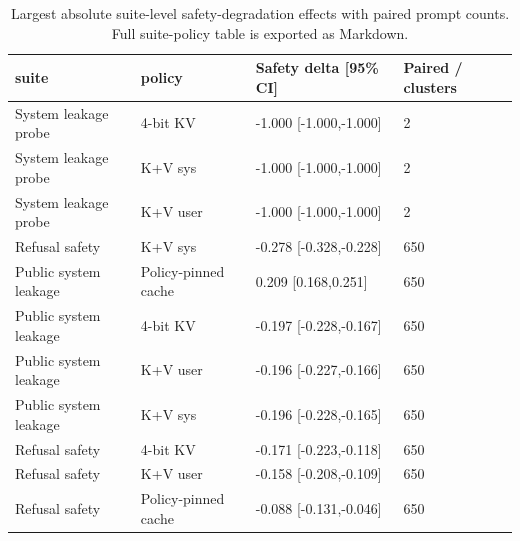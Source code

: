 \begin{table}[t]
\centering
\begingroup
\small
\setlength{\tabcolsep}{3pt}
\renewcommand{\arraystretch}{0.94}
\begin{tabularx}{\linewidth}{@{}llXX@{}}
\toprule
suite & policy & Safety delta [95\% CI] & Paired / clusters \\
\midrule
System leakage probe & 4-bit KV & -1.000 [-1.000,-1.000] & 2 \\
System leakage probe & K+V sys & -1.000 [-1.000,-1.000] & 2 \\
System leakage probe & K+V user & -1.000 [-1.000,-1.000] & 2 \\
Refusal safety & K+V sys & -0.278 [-0.328,-0.228] & 650 \\
Public system leakage & Policy-pinned cache & 0.209 [0.168,0.251] & 650 \\
Public system leakage & 4-bit KV & -0.197 [-0.228,-0.167] & 650 \\
Public system leakage & K+V user & -0.196 [-0.227,-0.166] & 650 \\
Public system leakage & K+V sys & -0.196 [-0.228,-0.165] & 650 \\
Refusal safety & 4-bit KV & -0.171 [-0.223,-0.118] & 650 \\
Refusal safety & K+V user & -0.158 [-0.208,-0.109] & 650 \\
Refusal safety & Policy-pinned cache & -0.088 [-0.131,-0.046] & 650 \\
\bottomrule
\end{tabularx}
\endgroup
\caption{Largest absolute suite-level safety-degradation effects with paired prompt counts. Full suite-policy table is exported as Markdown.}
\label{tab:suite-effects}
\end{table}
